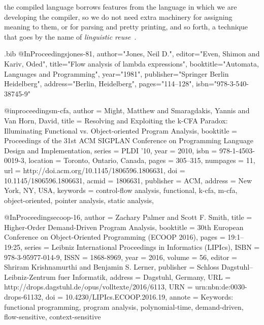 \documentclass[12pt, oneside]{book}
\begin{document}
the compiled language borrows features from the language in which we are developing the compiler, so we do not need extra machinery for assigning meaning to them, or for parsing and pretty printing, and so forth, a technique that goes by the name of \emph{linguistic reuse}~\cite{linguistic-reuse}.

\backmatter

\begin{filecontents*}{\jobname.bib}
@InProceedings{jones-81,
  author="Jones, Neil D.",
  editor="Even, Shimon
  and Kariv, Oded",
  title="Flow analysis of lambda expressions",
  booktitle="Automata, Languages and Programming",
  year="1981",
  publisher="Springer Berlin Heidelberg",
  address="Berlin, Heidelberg",
  pages="114--128",
  isbn="978-3-540-38745-9"
}

@inproceedings{m-cfa,
  author = {Might, Matthew and Smaragdakis, Yannis and Van Horn, David},
  title = {Resolving and Exploiting the k-CFA Paradox: Illuminating Functional vs. Object-oriented Program Analysis},
  booktitle = {Proceedings of the 31st ACM SIGPLAN Conference on Programming Language Design and Implementation},
  series = {PLDI '10},
  year = {2010},
  isbn = {978-1-4503-0019-3},
  location = {Toronto, Ontario, Canada},
  pages = {305--315},
  numpages = {11},
  url = {http://doi.acm.org/10.1145/1806596.1806631},
  doi = {10.1145/1806596.1806631},
  acmid = {1806631},
  publisher = {ACM},
  address = {New York, NY, USA},
  keywords = {control-flow analysis, functional, k-cfa, m-cfa, object-oriented, pointer analysis, static analysis},
}

@InProceedings{ecoop-16,
  author = {Zachary Palmer and Scott F. Smith},
  title = {{Higher-Order Demand-Driven Program Analysis}},
  booktitle = {30th European Conference on Object-Oriented Programming (ECOOP 2016)},
  pages = {19:1--19:25},
  series = {Leibniz International Proceedings in Informatics (LIPIcs)},
  ISBN = {978-3-95977-014-9},
  ISSN = {1868-8969},
  year = {2016},
  volume = {56},
  editor = {Shriram Krishnamurthi and Benjamin S. Lerner},
  publisher = {Schloss Dagstuhl--Leibniz-Zentrum fuer Informatik},
  address = {Dagstuhl, Germany},
  URL =  {http://drops.dagstuhl.de/opus/volltexte/2016/6113},
  URN =  {urn:nbn:de:0030-drops-61132},
  doi =  {10.4230/LIPIcs.ECOOP.2016.19},
  annote = {Keywords: functional programming, program analysis, polynomial-time, demand-driven, flow-sensitive, context-sensitive}
}


\end{filecontents*}
\end{document}
